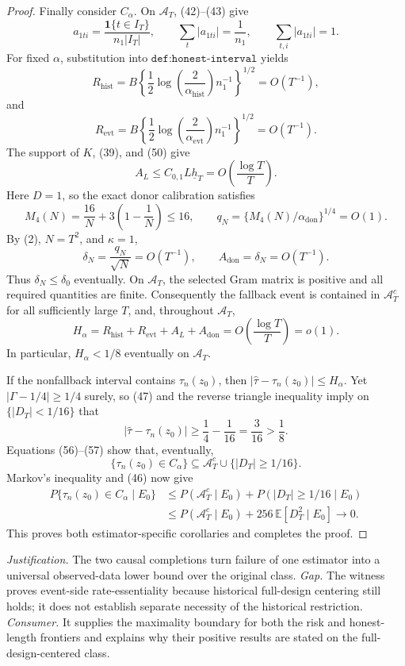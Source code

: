 \documentclass{article}
\begin{document}
\begin{proof}
Finally consider \(C_\alpha\).  On \(\mathcal A_T\), (42)--(43) give
\[
a_{1ti}=\frac{\mathbf1\{t\in I_T\}}{n_1|I_T|},
\qquad
\sum_t|a_{1ti}|=\frac1{n_1},
\qquad
\sum_{t,i}|a_{1ti}|=1.
\tag{50}
\]
For fixed \(\alpha\), substitution into \(\texttt{def:honest-interval}\) yields
\[
R_{\mathrm{hist}}
=B\left\{\frac12\log\left(\frac2{\alpha_{\mathrm{hist}}}\right)n_1^{-1}\right\}^{1/2}
=O(T^{-1}),
\tag{51}
\]
and
\[
R_{\mathrm{evt}}
=B\left\{\frac12\log\left(\frac2{\alpha_{\mathrm{evt}}}\right)n_1^{-1}\right\}^{1/2}
=O(T^{-1}).
\tag{52}
\]
The support of \(K\), (39), and (50) give
\[
A_L\le C_{0,1}L\underline h_T
=O\!\left(\frac{\log T}{T}\right).
\tag{53}
\]
Here \(D=1\), so the exact donor calibration satisfies
\[
M_4(N)=\frac{16}{N}+3\left(1-\frac1N\right)\le16,
\qquad
q_N=\{M_4(N)/\alpha_{\mathrm{don}}\}^{1/4}=O(1).
\tag{54}
\]
By (2), \(N=T^2\), and \(\kappa=1\),
\[
\delta_N=\frac{q_N}{\sqrt N}=O(T^{-1}),
\qquad
A_{\mathrm{don}}=\delta_N=O(T^{-1}).
\tag{55}
\]
Thus \(\delta_N\le\delta_0\) eventually.  On \(\mathcal A_T\), the selected Gram matrix is positive and all required quantities are finite.  Consequently the fallback event is contained in \(\mathcal A_T^c\) for all sufficiently large \(T\), and, throughout \(\mathcal A_T\),
\[
H_\alpha
=R_{\mathrm{hist}}+R_{\mathrm{evt}}+A_L+A_{\mathrm{don}}
=O\!\left(\frac{\log T}{T}\right)
=o(1).
\tag{56}
\]
In particular, \(H_\alpha<1/8\) eventually on \(\mathcal A_T\).

If the nonfallback interval contains \(\tau_n(z_0)\), then \(|\widehat\tau-\tau_n(z_0)|\le H_\alpha\).  Yet \(|\Gamma-1/4|\ge1/4\) surely, so (47) and the reverse triangle inequality imply on \(\{|D_T|<1/16\}\) that
\[
|\widehat\tau-\tau_n(z_0)|
\ge\frac14-\frac1{16}
=\frac3{16}>\frac18.
\tag{57}
\]
Equations (56)--(57) show that, eventually,
\[
\{\tau_n(z_0)\in C_\alpha\}
\subseteq \mathcal A_T^c\cup\{|D_T|\ge1/16\}.
\tag{58}
\]
Markov's inequality and (46) now give
\[
\begin{aligned}
P\{\tau_n(z_0)\in C_\alpha\mid E_0\}
&\le P(\mathcal A_T^c\mid E_0)
+P(|D_T|\ge1/16\mid E_0)\\
&\le P(\mathcal A_T^c\mid E_0)
+256\,\mathbb E[D_T^2\mid E_0]
\longrightarrow0.
\end{aligned}
\tag{59}
\]
This proves both estimator-specific corollaries and completes the proof.
\end{proof}
\par\smallskip\noindent \textit{Justification.} The two causal completions turn failure of one estimator into a universal observed-data lower bound over the original class. \textit{Gap.} The witness proves event-side rate-essentiality because historical full-design centering still holds; it does not establish separate necessity of the historical restriction. \textit{Consumer.} It supplies the maximality boundary for both the risk and honest-length frontiers and explains why their positive results are stated on the full-design-centered class.
\end{document}
